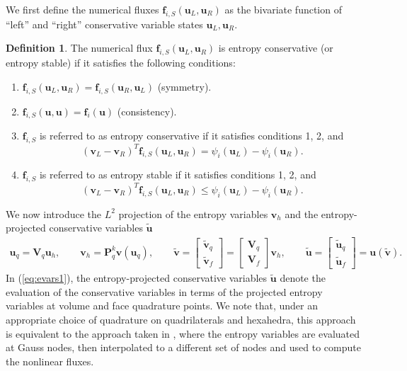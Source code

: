 \documentclass[preprint,10pt]{article}
\theoremstyle{definition}
\newtheorem{definition}{Definition}
\theoremstyle{lemma}
\theoremstyle{theorem}
\theoremstyle{assumption}
\renewcommand{\tilde}{\widetilde}
\newcommand{\LRp}[1]{\left( #1 \right)}
\newcommand{\LRs}[1]{\left[ #1 \right]}
\newcommand{\note}[1]{{\color{blue}{#1}}}
\newcommand{\lcwnote}[1]{{\color{magenta}{#1}}}
\begin{document}
{We first define the numerical fluxes $\bm{f}_{i,S}\LRp{\bm{u}_L,\bm{u}_R}$ as the bivariate function of ``left'' and ``right'' conservative variable states $\bm{u}_L, \bm{u}_R$.  %
\begin{definition}
The numerical flux $\bm{f}_{i,S}\LRp{\bm{u}_L,\bm{u}_R}$ is entropy conservative (or entropy stable) if it satisfies the following conditions:
\begin{enumerate}
\item $\bm{f}_{i,S}\LRp{\bm{u}_L,\bm{u}_R} = \bm{f}_{i,S}\LRp{\bm{u}_R,\bm{u}_L}$ (symmetry).
\item $\bm{f}_{i,S}\LRp{\bm{u},\bm{u}} = \bm{f}_i\LRp{\bm{u}}$ (consistency).
\item $\bm{f}_{i,S}$ is referred to as entropy conservative if it satisfies conditions 1, 2, and  
\[
  \LRp{\bm{v}_L-\bm{v}_R}^T\bm{f}_{i,S}\LRp{\bm{u}_L,\bm{u}_R} = \psi_i\LRp{\bm{u}_L}-\psi_i\LRp{\bm{u}_R}.
\]
\item $\bm{f}_{i,S}$ is referred to as entropy stable if it satisfies conditions 1, 2, and  
\[
\LRp{\bm{v}_L-\bm{v}_R}^T\bm{f}_{i,S}\LRp{\bm{u}_L,\bm{u}_R} \leq \psi_i\LRp{\bm{u}_L}-\psi_i\LRp{\bm{u}_R}.
\]
\end{enumerate}
\label{def:entropyflux}
\end{definition}

We now introduce the $L^2$ projection of the entropy variables $\bm{v}_h$ and the entropy-projected conservative variables $\tilde{\bm{u}}$ 
\begin{align}
\bm{u}_q = \bm{V}_q \bm{u}_h, \qquad \bm{v}_h = \bm{P}^k_q \bm{v}\LRp{\bm{u}_q}, \qquad 
\tilde{\bm{v}} = \LRs{\begin{array}{c}
\tilde{\bm{v}}_q\\
\tilde{\bm{v}}_f
\end{array}} = \LRs{\begin{array}{c}
\bm{V}_q\\
\bm{V}_f
\end{array}}\bm{v}_h, \qquad \tilde{\bm{u}} = \LRs{\begin{array}{c}
\tilde{\bm{u}}_q\\
\tilde{\bm{u}}_f
\end{array}} = \bm{u}\LRp{\tilde{\bm{v}}}.
\label{eq:evars1}
\end{align}
In (\ref{eq:evars1}), the entropy-projected conservative variables $\tilde{\bm{u}}$ denote the evaluation of the conservative variables in terms of the projected entropy variables at volume and face quadrature points.  We note that, under an appropriate choice of quadrature on quadrilaterals and hexahedra, this approach is equivalent to the approach taken in \cite{parsani2016entropy}, where the entropy variables are evaluated at Gauss nodes, then interpolated to a different set of nodes and used to compute the nonlinear fluxes.  

}
\end{document}
